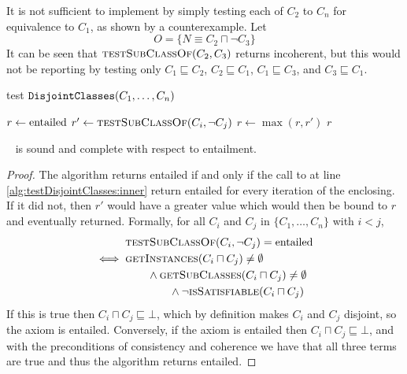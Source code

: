 \documentclass[paper.tex]{subfiles}
\begin{document}
It is not sufficient to implement  by simply testing each of $C_2$ to $C_n$ for equivalence to $C_1$, as shown by a counterexample.  Let
\[ O = \{ N \equiv C_2 \sqcap \neg C_3 \} \]
It can be seen that $\Call{testSubClassOf}{C_2, C_3}$ returns incoherent, but this would not be reporting by testing only $C_1 \sqsubseteq C_2$, $C_2 \sqsubseteq C_1$, $C_1 \sqsubseteq C_3$, and $C_3 \sqsubseteq C_1$.


\begin{algorithm}[H]
  \caption{test $\mathtt{DisjointClasses}(C_1, \ldots, C_n)$}
  \begin{algorithmic}[1]
    \raggedright
      \State $r \gets \mathrm{entailed}$
          \State $r' \gets \Call{testSubClassOf}{C_i, \neg C_j}$
          \label{alg:testDisjointClasses:inner}
          \State $r \gets \max(r, r')$
        \EndFor
      \EndFor
      \State \Return $r$
    \EndFunction
  \end{algorithmic}
\end{algorithm}

\begin{proposition}
  \sloppy~
   is sound and complete with respect to entailment.
\end{proposition}
\begin{proof}
  The algorithm returns entailed if and only if the call to  at line \ref{alg:testDisjointClasses:inner} return entailed for every iteration of the enclosing.  If it did not, then $r'$ would have a greater value which would then be bound to $r$ and eventually returned.  Formally, for all $C_i$ and $C_j$ in $\{C_1, \ldots, C_n\}$ with $i < j$,
  \begin{align*}
    & \Call{testSubClassOf}{C_i, \neg C_j} = \entailed \\
    \iff{}& \Call{getInstances}{C_i \sqcap C_j} \ne \emptyset \\
      & \qquad \land \Call{getSubClasses}{C_i \sqcap C_j} \ne \emptyset \\
      & \qquad\qquad \land \neg \Call{isSatisfiable}{C_i \sqcap C_j}
  \end{align*}
  If this is true then $C_i \sqcap C_j \sqsubseteq \bot$, which by definition makes $C_i$ and $C_j$ disjoint, so the axiom is entailed.  Conversely, if the axiom is entailed then $C_i \sqcap C_j \sqsubseteq \bot$, and with the preconditions of consistency and coherence we have that all three terms are true and thus the algorithm returns entailed.
\end{proof}
\end{document}
